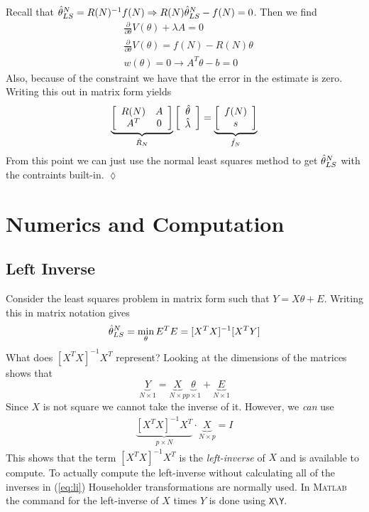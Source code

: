 \begin{example}
\begin{align*}
\begin{split}
\end{split}
\end{align*}
Recall that $\hat{\theta}_{LS}^N=R(N)^{-1}f(N)\Rightarrow R(N)\hat{\theta}_{LS}^N-f(N)=0$. Then we find
\begin{align*}
&\frac{\partial}{\partial\theta}V(\theta) +\lambda A = 0 \\
&\frac{\partial}{\partial\theta}V(\theta) = f(N)-R(N)\theta \\
&w(\theta)=0\rightarrow A^T\theta-b=0
\end{align*}
Also, because of the constraint we have that the error in the estimate is zero. Writing this out in matrix form yields
\begin{align*}
\underbrace{\left[\begin{array}{c c} R(N) & A \\ A^T & 0 \end{array}\right]}_{\tilde{R}_N} \left[\begin{array}{c} \hat{\theta} \\ \hat{\lambda} \end{array}\right] = \underbrace{\left[\begin{array}{c} f(N) \\ s \end{array}\right]}_{\tilde{f}_N}
\end{align*}
From this point we can just use the normal least squares method to get $\hat{\theta}_{LS}^N$ with the contraints built-in.
$\lozenge$
\end{example}

\section{Numerics and Computation}
\subsection{Left Inverse}
Consider the least squares problem in matrix form such that $Y=X\theta+E$. Writing this in matrix notation gives
$$\hat{\theta}_{LS}^N = \min_\theta E^TE = [X^TX]^{-1}[X^TY]$$
What does $[X^TX]^{-1}X^T$ represent? Looking at the dimensions of the matrices shows that
$$\underbrace{Y}_{N\times1} = \underbrace{X}_{N\times p} \underbrace{\theta}_{p\times1} + \underbrace{E}_{N\times1}$$
Since $X$ is not square we cannot take the inverse of it. However, we \textit{can} use
\begin{align}
\label{eq:li}
\underbrace{[X^TX]^{-1}X^T}_{p\times N} \cdot \underbrace{X}_{N\times p} = I
\end{align}
This shows that the term $[X^TX]^{-1}X^T$ is the \textit{left-inverse} of $X$ and is available to compute. To actually compute the left-inverse without calculating all of the inverses in (\ref{eq:li}) Householder transformations are normally used. In \textsc{Matlab} the command for the left-inverse of $X$ times $Y$ is done using \texttt{X\textbackslash Y}.

